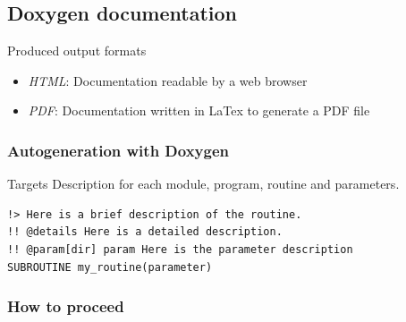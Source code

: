\documentclass[10p]{beamer}
\begin{document}
\subsection{Doxygen documentation}
\begin{frame}[fragile]
\begin{block}{Produced output formats}
\begin{itemize}
\item \textit{HTML}: Documentation readable by a web browser
\item \textit{PDF}: Documentation written in LaTex to generate a PDF file
\end{itemize}
\end{block}

\frametitle{Autogeneration with Doxygen}
\begin{block}{Targets}
Description for each module, program, routine and parameters.
\end{block}

\begin{example}
\begin{lstlisting}
!> Here is a brief description of the routine.
!! @details Here is a detailed description.
!! @param[dir] param Here is the parameter description
SUBROUTINE my_routine(parameter)
\end{lstlisting}
\end{example}
\end{frame}

\begin{frame}
\frametitle{How to proceed}
\end{frame}
\end{document}
